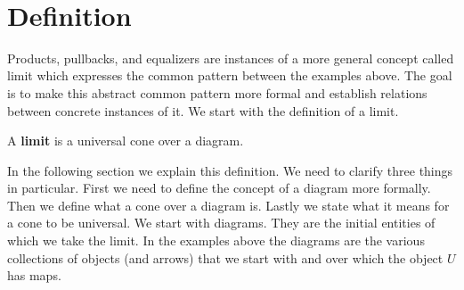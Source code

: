\begin{minipage}{.35\linewidth}
\end{minipage}%
\begin{minipage}{.3\linewidth}
\end{minipage}\\[2em]

\section{Definition}
Products, pullbacks, and equalizers are instances of a more general concept called
limit which expresses the common pattern between the examples above.
The goal is to make this abstract common pattern more formal
and establish relations between concrete instances of it.
We start with the definition of a limit.\\

\begin{definition}
  A \textbf{limit} is a universal cone over a diagram.
\end{definition}

In the following section we explain this definition. We need to clarify three things
in particular.
First we need to define the concept of a diagram more formally.
Then we define what a cone over a diagram is. Lastly we state what it means for a cone
to be universal.
We start with diagrams. They are the initial entities of which we take the limit.
In the examples above the diagrams
are the various collections of objects (and arrows) that we start with
and over which the object $U$ has maps.

